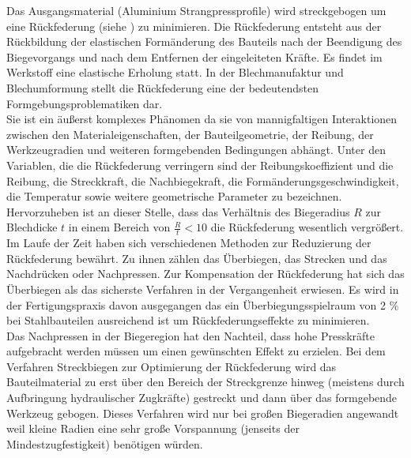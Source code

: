 \documentclass[12pt,a4paper,parskip,twoside,BCOR5mm,headsepline]{scrartcl}
\begin{document}
  
Das Ausgangsmaterial (Aluminium Strangpressprofile) wird streckgebogen um eine Rückfederung (siehe ) zu minimieren.  Die Rückfederung entsteht aus der Rückbildung der elastischen Formänderung des Bauteils nach der Beendigung des Biegevorgangs und nach dem Entfernen der eingeleiteten Kräfte. Es findet im Werkstoff eine elastische Erholung statt. In der Blechmanufaktur und Blechumformung stellt die Rückfederung eine der bedeutendsten Formgebungsproblematiken dar.
\\

 Sie ist ein äußerst komplexes Phänomen da sie von mannigfaltigen Interaktionen zwischen den Materialeigenschaften, der Bauteilgeometrie, der Reibung,  der Werkzeugradien und weiteren formgebenden Bedingungen abhängt. Unter den Variablen, die die Rückfederung verringern sind der Reibungskoeffizient und die Reibung, die Streckkraft, die Nachbiegekraft, die Formänderungsgeschwindigkeit, die Temperatur sowie weitere geometrische Parameter zu bezeichnen. Hervorzuheben ist an dieser Stelle, dass das Verhältnis des Biegeradius $ R $ zur Blechdicke $ t $ in einem Bereich von $ \frac{R}{t} < 10 $ die Rückfederung wesentlich vergrößert. Im Laufe der Zeit haben sich verschiedenen Methoden zur Reduzierung der Rückfederung bewährt. Zu ihnen zählen das Überbiegen, das Strecken und das Nachdrücken oder Nachpressen. Zur Kompensation der Rückfederung hat sich das Überbiegen als das sicherste Verfahren in der Vergangenheit erwiesen. Es wird in der Fertigungspraxis davon ausgegangen das ein Überbiegungsspielraum von 2 \%  bei Stahlbauteilen ausreichend ist um Rückfederungseffekte zu minimieren.\\ Das Nachpressen in der Biegeregion hat den Nachteil, dass hohe Presskräfte aufgebracht werden müssen um einen gewünschten Effekt zu erzielen. Bei dem Verfahren  Streckbiegen zur Optimierung der Rückfederung wird das Bauteilmaterial zu erst über den Bereich der Streckgrenze hinweg (meistens durch Aufbringung hydraulischer Zugkräfte) gestreckt und dann über das formgebende Werkzeug gebogen. Dieses Verfahren wird nur bei großen Biegeradien angewandt weil kleine Radien eine sehr große Vorspannung (jenseits der Mindestzugfestigkeit) benötigen würden. \autocite[16-19]{hmp}\\  
 
\end{document}
